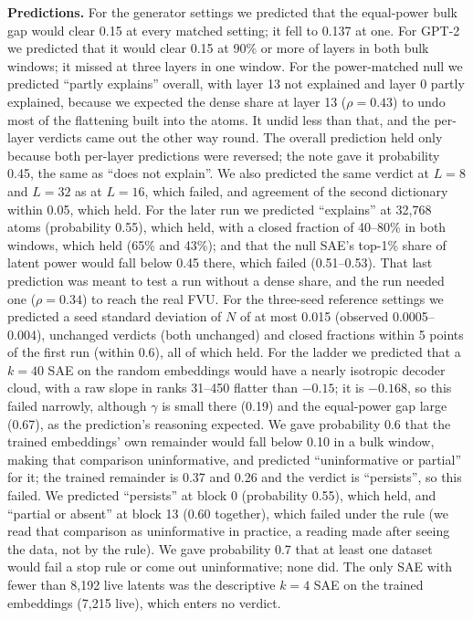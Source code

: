 \documentclass{article}
\begin{document}
\textbf{Predictions.} For the generator settings we predicted that the equal-power bulk gap would clear 0.15 at every matched setting; it fell to 0.137 at one. For GPT-2 we predicted that it would clear 0.15 at 90\% or more of layers in both bulk windows; it missed at three layers in one window. For the power-matched null we predicted ``partly explains'' overall, with layer 13 not explained and layer 0 partly explained, because we expected the dense share at layer 13 ($\rho=0.43$) to undo most of the flattening built into the atoms. It undid less than that, and the per-layer verdicts came out the other way round. The overall prediction held only because both per-layer predictions were reversed; the note gave it probability 0.45, the same as ``does not explain''. We also predicted the same verdict at $L=8$ and $L=32$ as at $L=16$, which failed, and agreement of the second dictionary within 0.05, which held. For the later run we predicted ``explains'' at 32,768 atoms (probability 0.55), which held, with a closed fraction of 40--80\% in both windows, which held (65\% and 43\%); and that the null SAE's top-1\% share of latent power would fall below 0.45 there, which failed (0.51--0.53). That last prediction was meant to test a run without a dense share, and the run needed one ($\rho=0.34$) to reach the real FVU. For the three-seed reference settings we predicted a seed standard deviation of $N$ of at most 0.015 (observed 0.0005--0.004), unchanged verdicts (both unchanged) and closed fractions within 5 points of the first run (within 0.6), all of which held. For the ladder we predicted that a $k=40$ SAE on the random embeddings would have a nearly isotropic decoder cloud, with a raw slope in ranks 31--450 flatter than $-0.15$; it is $-0.168$, so this failed narrowly, although $\gamma$ is small there (0.19) and the equal-power gap large (0.67), as the prediction's reasoning expected. We gave probability 0.6 that the trained embeddings' own remainder would fall below 0.10 in a bulk window, making that comparison uninformative, and predicted ``uninformative or partial'' for it; the trained remainder is 0.37 and 0.26 and the verdict is ``persists'', so this failed. We predicted ``persists'' at block 0 (probability 0.55), which held, and ``partial or absent'' at block 13 (0.60 together), which failed under the rule (we read that comparison as uninformative in practice, a reading made after seeing the data, not by the rule). We gave probability 0.7 that at least one dataset would fail a stop rule or come out uninformative; none did. The only SAE with fewer than 8,192 live latents was the descriptive $k=4$ SAE on the trained embeddings (7,215 live), which enters no verdict.
\end{document}
